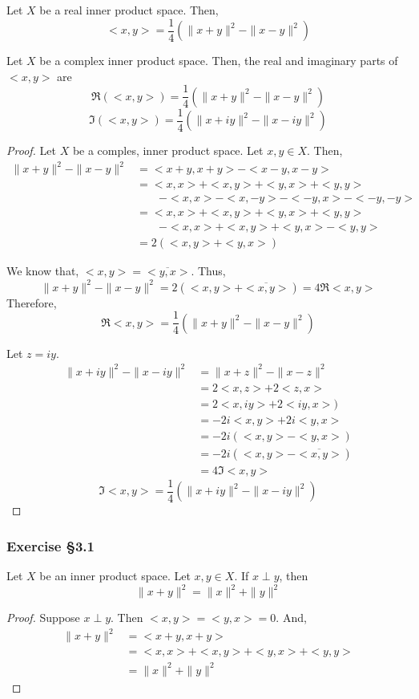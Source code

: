 \begin{remark}
	Let $X$ be a real inner product space.
	Then,
	\[ <x,y> = \frac{1}{4}\left(\|x+y\|^2 - \|x-y\|^2 \right) \]
\end{remark}
\begin{theorem}
	Let $X$ be a complex inner product space.
	Then, the real and imaginary parts of $<x,y>$ are
	\[ \Re(<x,y>) = \frac{1}{4}\left(\|x+y\|^2 - \|x-y\|^2 \right) \]
	\[ \Im(<x,y>) = \frac{1}{4}\left(\|x+iy\|^2 - \|x-iy\|^2 \right) \]
\end{theorem}
\begin{proof}
	Let $X$ be a comples, inner product space.
	Let $x,y \in X$.
	Then,
	\begin{align*}
		\|x+y\|^2-\|x-y\|^2 
		& = <x+y,x+y> - <x-y,x-y> \\
		& = <x,x> + <x,y> + <y,x> + <y,y> \\
		& \qquad - <x,x> - <x,-y> - <-y,x> - <-y,-y> \\
		& = <x,x> + <x,y> + <y,x> + <y,y> \\
		& \qquad - <x,x> + <x,y> + <y,x> - <y,y> \\
		& = 2(<x,y> + <y,x>)
	\end{align*}

	We know that, $<x,y> = \overline{<y,x>}$.
	Thus, 
	\[ \|x+y\|^2 - \|x-y\|^2 = 2(<x,y>+\overline{<x,y>}) = 4\Re <x,y> \]
	Therefore, 
	\[ \Re <x,y> = \frac{1}{4} \left( \|x+y\|^2-\|x-y\|^2 \right) \]
	
	Let $z = iy$.
	\begin{align*}
		\|x+iy\|^2 - \|x-iy\|^2 
		& = \|x+z\|^2 - \|x-z\|^2 \\
		& = 2<x,z>+2<z,x> \\
		& = 2<x,iy>+2<iy,x>) \\
		& = -2i<x,y> + 2i<y,x> \\
		& = -2i(<x,y>-<y,x>) \\
		& = -2i(<x,y>-\overline{<x,y>}) \\
		& = 4 \Im{<x,y>} 
	\end{align*}
	\[ \Im <x,y> = \frac{1}{4} \left( \|x+iy\|^2-\|x-iy\|^2 \right) \]
\end{proof}
\subsubsection{Exercise \S3.1}
\begin{theorem}
	Let $X$ be an inner product space.
	Let $x,y \in X$.
	If $x \perp y$, then
	\[ \|x+y\|^2 = \|x\|^2 + \|y\|^2 \]
\end{theorem}
\begin{proof}
	Suppose $x \perp y$.
	Then $<x,y> = <y,x> = 0$.
	And,
	\begin{align*}
		\|x+y\|^2 
		& = <x+y,x+y> \\
		& = <x,x> + <x,y> + <y,x> + <y,y> \\
		&  = \|x\|^2 + \|y\|^2
	\end{align*}
\end{proof}

